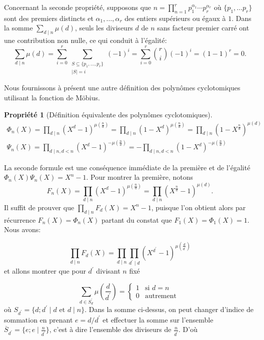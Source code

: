 \documentclass{article}
\theoremstyle{break}                  %
\newtheorem{propriete}{Propriété}
\begin{document}
Concernant la seconde propriété, supposons que $n = \displaystyle \prod_{n = 1}^r p_1^{\alpha_1} \cdots p_r^{\alpha_r}$ où $\{p_1, \dots p_r\}$ sont des premiers distincts et $\alpha_1, \dots, \alpha_r$ des entiers supérieurs ou égaux à $1$. Dans la somme $\displaystyle \sum_{d \mid n} \mu(d)$, seuls les diviseurs $d$ de $n$ sans facteur premier carré ont une contribution non nulle, ce qui conduit à l'égalité:
$$\sum_{d \mid n} \mu(d) = \sum_{i = 0}^{r}\sum_{\substack{S \subseteq \{p_1, \dots, p_r\}\\ \left\vert S \right\vert = i}} (-1)^i = \sum_{i = 0}^{r} \binom{r}{i}(-1)^i =(1-1)^r=0.$$

Nous fournissons à présent une autre définition des polynômes cyclotomiques utilisant la fonction de Möbius.

\begin{propriete}[Définition équivalente des polynômes cyclotomiques]
	\begin{align}		
		\Phi_n(X) = \prod_{d \mid n} (X^d - 1)^{\mu(\frac{n}{d})} = \prod_{d \mid n} (1 - X^d)^{\mu(\frac{n}{d})} = \prod_{d \mid n} (1 - X^\frac{n}{d})^{\mu(d)} \tag{2.4}\label{mobphi}\\
		\Psi_n(X) = \prod_{d \mid n, d<n} (X^d - 1)^{-\mu(\frac{n}{d})} = -\prod_{d \mid n, d<n} (1 - X^d)^{-\mu(\frac{n}{d})}\tag{2.5}\label{mobpsi}
	\end{align}
\end{propriete}

La seconde formule est une conséquence immédiate de la première et de l'égalité $\Phi_n(X) \Psi_n(X) = X^n-1$. Pour montrer la première, notons
$$F_n(X) = \prod_{d \mid n} (X^d - 1)^{\mu(\frac{n}{d})} = \prod_{d \mid n} (X^{\frac{n}{d}} - 1)^{\mu(d)}.$$ Il suffit de prouver que $\displaystyle \prod_{ d \mid n} F_d(X) = X^n-1$, puisque l'on obtient alors par récurrence $F_n(X) = \Phi_n(X)$ partant du constat que $F_1(X) = \Phi_1(X) = 1$. Nous avons:

$$\prod_{ d \mid n} F_d(X) = \prod_{ d \mid n} \prod_{d^\prime \mid d} (X^{d^\prime} - 1)^{\mu(\frac{d}{d^\prime})}$$ et allons montrer que pour $d^\prime$ divisant $n$ fixé

$$\sum_{d \in S_d^\prime} \mu\left(\frac{d}{d^\prime}\right)=\begin{cases}1 &\text{si } d= n\\
	0 &\text{autrement }\end{cases}$$ où $S_{d^\prime} = \{d ; d^\prime \mid d \text{ et } d \mid n\}$.
Dans la somme ci-dessus, on peut changer d'indice de sommation en prenant $e = d/d^\prime$ et effectuer la somme sur l'ensemble $\overline{S}_{d^\prime} = \{e ; e \mid \frac{n}{d^\prime}\}$, c'est à dire l'ensemble des diviseurs de $\frac{n}{d^\prime}$. D'où
\end{document}

